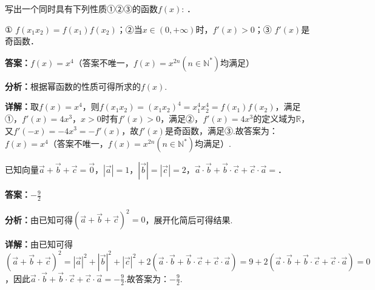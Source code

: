 \begin{question}[points=5]
写出一个同时具有下列性质①②③的函数$f(x)$: ．

① $f(x_1x_2)=f(x_1)f(x_2)$；②当$x\in(0,+\infty)$时，$f'(x)>0$；③ $f'(x)$是奇函数．
\fillin[{$f(x)=x^4$（答案不唯一，$f(x)=x^{2n}(n\in\mathbb{N}^*)$均满足）}]
\begin{solution}
\textbf{答案：}$f(x)=x^4$（答案不唯一，$f(x)=x^{2n}(n\in\mathbb{N}^*)$均满足）

\textbf{分析：}根据幂函数的性质可得所求的$f(x)$.

\textbf{详解：}取$f(x)=x^4$，则$f(x_1x_2)=(x_1x_2)^4=x_1^4x_2^4=f(x_1)f(x_2)$，满足①，$f'(x)=4x^3$，$x>0$时有$f'(x)>0$，满足②，$f'(x)=4x^3$的定义域为$\mathbb{R}$，又$f'(-x)=-4x^3=-f'(x)$，故$f'(x)$是奇函数，满足③.故答案为：$f(x)=x^4$（答案不唯一，$f(x)=x^{2n}(n\in\mathbb{N}^*)$均满足）.
\end{solution}
\end{question}

\begin{question}[points=5]
已知向量$\vec{a}+\vec{b}+\vec{c}=\vec{0}$，$|\vec{a}|=1$，$|\vec{b}|=|\vec{c}|=2$，$\vec{a}\cdot\vec{b}+\vec{b}\cdot\vec{c}+\vec{c}\cdot\vec{a}=$．
\fillin[{$-\frac{9}{2}$}]
\begin{solution}
\textbf{答案：}$-\frac{9}{2}$

\textbf{分析：}由已知可得$(\vec{a}+\vec{b}+\vec{c})^2=0$，展开化简后可得结果.

\textbf{详解：}由已知可得$(\vec{a}+\vec{b}+\vec{c})^2=|\vec{a}|^2+|\vec{b}|^2+|\vec{c}|^2+2(\vec{a}\cdot\vec{b}+\vec{b}\cdot\vec{c}+\vec{c}\cdot\vec{a})=9+2(\vec{a}\cdot\vec{b}+\vec{b}\cdot\vec{c}+\vec{c}\cdot\vec{a})=0$，因此$\vec{a}\cdot\vec{b}+\vec{b}\cdot\vec{c}+\vec{c}\cdot\vec{a}=-\frac{9}{2}$.故答案为：$-\frac{9}{2}$.
\end{solution}
\end{question}

